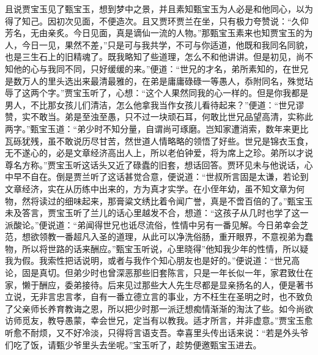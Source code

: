 \begin{parag}
    且说贾宝玉见了甄宝玉，想到梦中之景，并且素知甄宝玉为人必是和他同心，以为得了知己。因初次见面，不便造次。且又贾环贾兰在坐，只有极力夸赞说：“久仰芳名，无由亲炙。今日见面，真是谪仙一流的人物。”那甄宝玉素来也知贾宝玉的为人，今日一见，果然不差，”只是可与我共学，不可与你适道，他既和我同名同貌，也是三生石上的旧精魂了。既我略知了些道理，怎么不和他讲讲。但是初见，尚不知他的心与我同不同，只好缓缓的来。”便道：“世兄的才名，弟所素知的，在世兄是数万人的里头选出来最清最雅的，在弟是庸庸碌碌一等愚人，忝附同名，殊觉玷辱了这两个字。”贾宝玉听了，心想：“这个人果然同我的心一样的。但是你我都是男人，不比那女孩儿们清洁，怎么他拿我当作女孩儿看待起来？”便道：“世兄谬赞，实不敢当。弟是至浊至愚，只不过一块顽石耳，何敢比世兄品望高清，实称此两字。”甄宝玉道：“弟少时不知分量，自谓尚可琢磨。岂知家遭消索，数年来更比瓦砾犹残，虽不敢说历尽甘苦，然世道人情略略的领悟了好些。世兄是锦衣玉食，无不遂心的，必是文章经济高出人上，所以老伯钟爱，将为席上之珍。弟所以才说尊名方称。”贾宝玉听这话头又近了碌蠹的旧套，想话回答。贾环见未与他说话，心中早不自在。倒是贾兰听了这话甚觉合意，便说道：“世叔所言固是太谦，若论到文章经济，实在从历练中出来的，方为真才实学。在小侄年幼，虽不知文章为何物，然将读过的细味起来，那膏粱文绣比着令闻广誉，真是不啻百倍的了。”甄宝玉未及答言，贾宝玉听了兰儿的话心里越发不合，想道：“这孩子从几时也学了这一派酸论。”便说道：“弟闻得世兄也诋尽流俗，性情中另有一番见解。今日弟幸会芝范，想欲领教一番超凡入圣的道理，从此可以净洗俗肠，重开眼界，不意视弟为蠢物，所以将世路的话来酬应。”甄宝玉听说，心里晓得”他知我少年的性情，所以疑我为假。我索性把话说明，或者与我作个知心朋友也是好的。”便说道：“世兄高论，固是真切。但弟少时也曾深恶那些旧套陈言，只是一年长似一年，家君致仕在家，懒于酬应，委弟接待。后来见过那些大人先生尽都是显亲扬名的人，便是著书立说，无非言忠言孝，自有一番立德立言的事业，方不枉生在圣明之时，也不致负了父亲师长养育教诲之恩，所以把少时那一派迂想痴情渐渐的淘汰了些。如今尚欲访师觅友，教导愚蒙，幸会世兄，定当有以教我。适才所言，并非虚意。”贾宝玉愈听愈不耐烦，又不好冷淡，只得将言语支吾。幸喜里头传出话来说：“若是外头爷们吃了饭，请甄少爷里头去坐呢。”宝玉听了，趁势便邀甄宝玉进去。
\end{parag}


